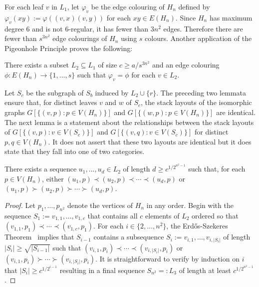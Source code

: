 \documentclass[kpfonts]{patmorin}
\renewcommand{\ge}{\geqslant}
\begin{document}

For each leaf $v$ in $L_1$, let $\varphi_v$ be the edge colouring of $H_n$ defined by $\varphi_v(xy):=\varphi((v,x)(v,y))$ for each $xy\in E(H_n)$. Since $H_n$ has maximum degree $6$ and is not 6-regular, it has fewer than $3n^2$ edges.  Therefore there are fewer than $s^{3n^2}$ edge colourings of $H_n$ using $s$ colours.  Another application of the Pigeonhole Principle proves the following:

\begin{lem}\label{uniform_colour}
    There exists a subset $L_2\subseteq L_1$ of size $c\ge a/s^{3n^2}$
    and an edge colouring $\phi:E(H_n)\to\{1,\ldots,s\}$ such that $\varphi_v=\phi$ for each $v\in L_2$.
\end{lem}


Let $S_{c}$ be the subgraph of $S_b$ induced by $L_2\cup\{r\}$. The preceding two lemmata ensure that, for distinct leaves $v$ and $w$ of $S_{c}$, the stack layouts of the isomorphic graphs $G[\{(v,p):p\in V(H_n)\}]$ and $G[\{(w,p):p\in V(H_n)\}]$ are identical. The next lemma is a statement about the relationships between the stack layouts of $G[\{(v,p):v\in V(S_{c})\}]$ and $G[\{(v,q):v\in V(S_{c})\}]$ for  distinct $p,q\in V(H_n)$.  It does not assert that these two layouts are identical but it does state that they fall into one of two categories.

\begin{lem}\label{forward_or_backward}
    There exists a sequence $u_1,\ldots,u_{d}\in L_2$ of length $d\ge c^{1/2^{n^2-1}}$ such that, for each $p\in V(H_n)$, either  $(u_1,p)\prec (u_2,p)\prec\cdots\prec (u_{d},p)$ or $(u_1,p)\succ (u_2,p)\succ\cdots\succ (u_{d},p)$.
\end{lem}

\begin{proof}
    Let $p_1,\ldots,p_{n^2}$ denote the vertices of $H_n$ in any order.
    Begin with the sequence $S_1:=v_{1,1},\ldots,v_{1,c}$ that contains all $c$ elements of $L_2$ ordered so that $(v_{1,1},p_1)\prec\cdots\prec(v_{1,c},p_1)$.  For each $i\in\{2,\ldots,n^2\}$, the Erd\H{o}s-Szekeres Theorem~\citep{ES35} implies that $S_{i-1}$ contains a subsequence $S_i:=v_{i,1},\ldots,v_{i,|S_i|}$ of length $|S_i|\ge \sqrt{|S_{i-1}|}$ such that $(v_{i,1},p_i)\prec\cdots\prec(v_{i,|S_i|},p_i)$ or $(v_{i,1},p_i)\succ\cdots\succ(v_{i,|S_i|},p_i)$.  It is straightforward to verify by induction on $i$ that $|S_i| \ge c^{1/2^{i-1}}$ resulting in a final sequence $S_{n^2}=:L_3$ of length at least $c^{1/2^{n^2-1}}$.
\end{proof}
\end{document}
